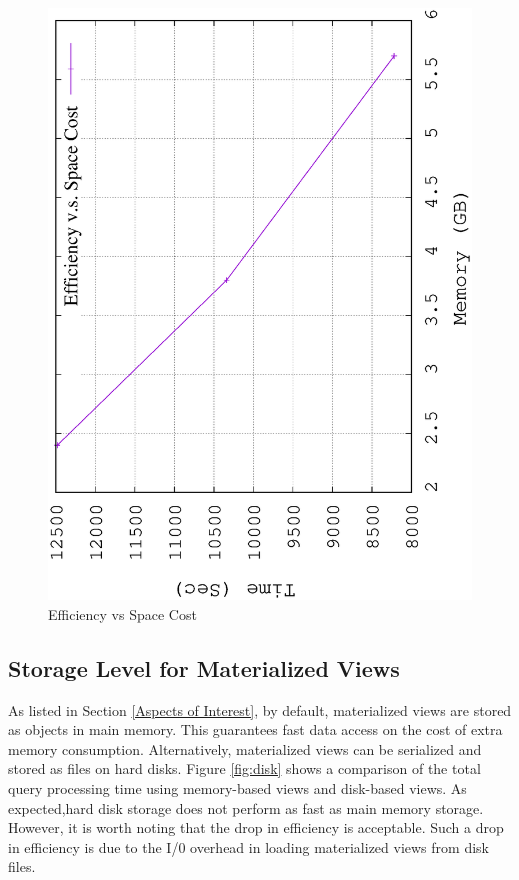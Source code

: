 	\begin{figure}[H]
		\centering
		\includegraphics[scale=0.5, angle=270]{plot/limit.eps}
		\caption{Efficiency vs Space Cost}
		\label{fig:limit}
	\end{figure}
	
	\subsection{Storage Level for Materialized Views}
	\label{Storage Level for Merialized Views}
	As listed in Section \ref{Aspects of Interest}, by default, materialized views are stored as objects in main memory. This guarantees fast data access on the cost of extra memory consumption. Alternatively, materialized views can be serialized and stored as files on hard disks. Figure \ref{fig:disk} shows a comparison of the total query processing time using memory-based views and disk-based views. As expected,hard disk storage does not perform as fast as main memory storage. However, it is worth noting that  the drop in efficiency is acceptable. Such a drop in efficiency is due to the I/0 overhead in loading materialized views from disk files.
	

